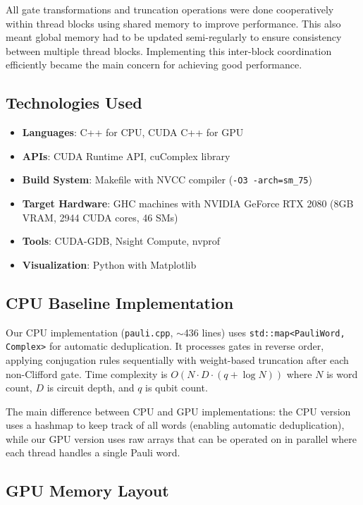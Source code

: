 \documentclass[11pt, a4paper]{article}
\begin{document}
All gate transformations and truncation operations were done cooperatively within thread blocks using shared memory to improve performance. This also meant global memory had to be updated semi-regularly to ensure consistency between multiple thread blocks. Implementing this inter-block coordination efficiently became the main concern for achieving good performance.

\subsection{Technologies Used}

\begin{itemize}
    \item \textbf{Languages}: C++ for CPU, CUDA C++ for GPU
    \item \textbf{APIs}: CUDA Runtime API, cuComplex library
    \item \textbf{Build System}: Makefile with NVCC compiler (\texttt{-O3 -arch=sm\_75})
    \item \textbf{Target Hardware}: GHC machines with NVIDIA GeForce RTX 2080 (8GB VRAM, 2944 CUDA cores, 46 SMs)
    \item \textbf{Tools}: CUDA-GDB, Nsight Compute, nvprof
    \item \textbf{Visualization}: Python with Matplotlib
\end{itemize}

\subsection{CPU Baseline Implementation}

Our CPU implementation (\texttt{pauli.cpp}, $\sim$436 lines) uses \texttt{std::map<PauliWord, Complex>} for automatic deduplication. It processes gates in reverse order, applying conjugation rules sequentially with weight-based truncation after each non-Clifford gate. Time complexity is $O(N \cdot D \cdot (q + \log N))$ where $N$ is word count, $D$ is circuit depth, and $q$ is qubit count.

The main difference between CPU and GPU implementations: the CPU version uses a hashmap to keep track of all words (enabling automatic deduplication), while our GPU version uses raw arrays that can be operated on in parallel where each thread handles a single Pauli word.

\subsection{GPU Memory Layout}
\end{document}
